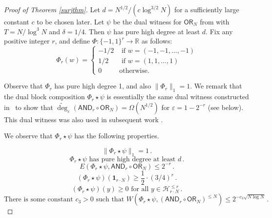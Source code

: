 \documentclass{toc}
\newcommand{\reals}{\mathbb{R}}
\newcommand{\OR}{\mathsf{ OR}}
\newcommand{\bits}{\{-1,1\}}
\newcommand{\ls}{\star}
\newcommand{\eps}{\varepsilon}
\newcommand{\Hcal}{\mathcal{H}}
\newcommand{\adeg}{\widetilde{\operatorname{deg}}}
\newcommand{\AND}{\mathsf{AND}}
\begin{document}
%
%
%
%
\begin{proof}[Proof of Theorem \ref{surjthm}]
	Let $d=N^{1/2}/(c \log^{3/2} N)$ for a sufficiently large constant $c$ to be chosen later. 
	Let 
	$\psi$ be the dual witness for $\OR_{N}$ from  with $T=N/\log^3 N$ and $\delta=1/4$. 
	Then $\psi$ has pure high degree at least $d$. %
	Fix any positive integer $r$, and 
	define $\Phi \colon \bits^{r} \to \reals$ as follows:
	$$\Phi_r(w) = \begin{cases}
	-1/2 & \text{ if } w=(-1, -1, \dots, -1)\\
	1/2 & \text{ if } w= (1, 1, \dots, 1)\\
	0 & \text{otherwise}.
	\end{cases}$$
	
Observe that $\Phi_r$ has pure high degree 1, and also $\|\Phi_r\|_1=1$. 
We remark that the dual block composition $\Phi_r \ls \psi$ is essentially the same dual witness constructed in~\cite{bt14} to show that
$\adeg_{\eps}(\AND_r \circ\OR_N) = \Omega(N^{1/2})$ for
$\eps = 1-2^{-r}$ (see  below).
This dual witness was also used in subsequent
work \cite{sherstov14, bchtv, bkt}.
	
%
%
We observe that $\Phi_r \ls \psi$ has the following properties. %
%

	\begin{equation}  \label{btprop1}
	\|\Phi_r \ls \psi\|_1=1\,.
	\end{equation}
	\begin{equation}  \label{btprop2}
	\Phi_r \ls \psi \text{ has pure high degree at least } d\,.
	\end{equation}
	\begin{equation}  \label{btprop3}
	E(\Phi_r \ls \psi, \AND_r \circ \OR_N) \leq 2^{-r}\,.
	\end{equation}
	\begin{equation}  \label{btprop4}
	\left(\Phi_r \ls \psi\right)\left(\mathbf{1}_{r \cdot N}\right) \geq \frac12 \cdot (3/4)^{r}\,.
	\end{equation}
	\begin{equation} \label{btprop5}
	\left(\Phi_r \ls \psi\right)(y) \geq 0 \text{ for all } y \in \Hcal_{r \cdot N}^{\leq r}\,. 
	\end{equation}
	\begin{equation} \label{btprop6}
\text{There is some constant } c_3>0 \text{ such that } W(\Phi_r \ls \psi, (\AND_r \circ \OR_N)^{\leq N}) \leq 2^{-c_3 \sqrt{N \log N}}\,.
	\end{equation}
	

\end{proof}
\end{document}
